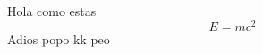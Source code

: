 \documentclass{article}
\begin{document}
    Hola como estas \hfill
    \begin{equation}
        E=mc^2
    \end{equation}    
    Adios popo kk peo
\end{document}
